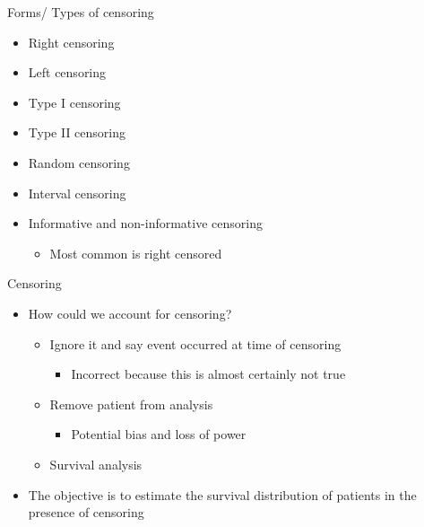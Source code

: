 \documentclass[ignorenonframetext,]{beamer}
\begin{document}
\begin{frame}{Forms/ Types of censoring}

\begin{itemize}
\itemsep1pt\parskip0pt
\item
  Right censoring
\item
  Left censoring
\item
  Type I censoring
\item
  Type II censoring
\item
  Random censoring
\item
  Interval censoring
\item
  Informative and non-informative censoring

  \begin{itemize}
  \itemsep1pt\parskip0pt
  \item
    Most common is right censored
  \end{itemize}
\end{itemize}

\end{frame}

\begin{frame}{Censoring}

\begin{itemize}
\itemsep1pt\parskip0pt
\item
  How could we account for censoring?

  \begin{itemize}
  \itemsep1pt\parskip0pt
  \item
    Ignore it and say event occurred at time of censoring

    \begin{itemize}
    \itemsep1pt\parskip0pt
    \item
      Incorrect because this is almost certainly not true
    \end{itemize}
  \item
    Remove patient from analysis

    \begin{itemize}
    \itemsep1pt\parskip0pt
    \item
      Potential bias and loss of power
    \end{itemize}
  \item
    Survival analysis
  \end{itemize}
\item
  The objective is to estimate the survival distribution of patients in
  the presence of censoring
\end{itemize}

\end{frame}
\end{document}
